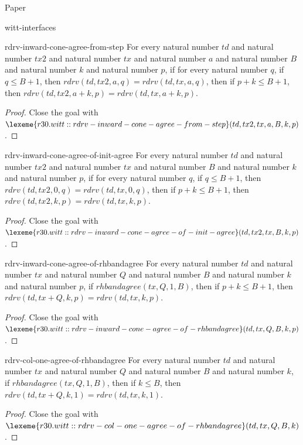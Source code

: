 \begin{lexlean}{Paper}
\begin{section}{witt-interfaces}
  \begin{theorem}{rdrv-inward-cone-agree-from-step}
  For every natural number \(td\) and natural number \(tx2\) and natural number \(tx\) and natural number \(a\) and natural number \(B\) and natural number \(k\) and natural number \(p\), if for every natural number \(q\), if \(q ≤ B + 1\), then \(rdrv(td, tx2, a, q) = rdrv(td, tx, a, q)\), then if \(p + k ≤ B + 1\), then \(rdrv(td, tx2, a + k, p) = rdrv(td, tx, a + k, p)\).
  \begin{proof}
  Close the goal with \(\lexeme{r30.witt::rdrv-inward-cone-agree-from-step}(td, tx2, tx, a, B, k, p)\).
  \end{proof}
  \end{theorem}

  \begin{theorem}{rdrv-inward-cone-agree-of-init-agree}
  For every natural number \(td\) and natural number \(tx2\) and natural number \(tx\) and natural number \(B\) and natural number \(k\) and natural number \(p\), if for every natural number \(q\), if \(q ≤ B + 1\), then \(rdrv(td, tx2, 0, q) = rdrv(td, tx, 0, q)\), then if \(p + k ≤ B + 1\), then \(rdrv(td, tx2, k, p) = rdrv(td, tx, k, p)\).
  \begin{proof}
  Close the goal with \(\lexeme{r30.witt::rdrv-inward-cone-agree-of-init-agree}(td, tx2, tx, B, k, p)\).
  \end{proof}
  \end{theorem}

  \begin{theorem}{rdrv-inward-cone-agree-of-rhbandagree}
  For every natural number \(td\) and natural number \(tx\) and natural number \(Q\) and natural number \(B\) and natural number \(k\) and natural number \(p\), if \(rhbandagree(tx, Q, 1, B)\), then if \(p + k ≤ B + 1\), then \(rdrv(td, tx + Q, k, p) = rdrv(td, tx, k, p)\).
  \begin{proof}
  Close the goal with \(\lexeme{r30.witt::rdrv-inward-cone-agree-of-rhbandagree}(td, tx, Q, B, k, p)\).
  \end{proof}
  \end{theorem}

  \begin{theorem}{rdrv-col-one-agree-of-rhbandagree}
  For every natural number \(td\) and natural number \(tx\) and natural number \(Q\) and natural number \(B\) and natural number \(k\), if \(rhbandagree(tx, Q, 1, B)\), then if \(k ≤ B\), then \(rdrv(td, tx + Q, k, 1) = rdrv(td, tx, k, 1)\).
  \begin{proof}
  Close the goal with \(\lexeme{r30.witt::rdrv-col-one-agree-of-rhbandagree}(td, tx, Q, B, k)\).
  \end{proof}
  \end{theorem}


\end{section}
\end{lexlean}
